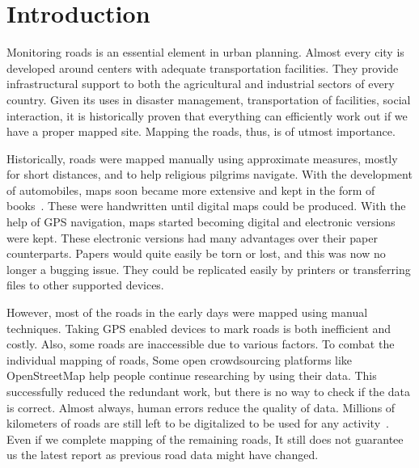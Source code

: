 \chapter{Introduction}\label{chapt:intro}

Monitoring roads is an essential element in urban planning. Almost every city is developed around centers with adequate transportation facilities. They provide infrastructural support to both the agricultural and industrial sectors of every country. Given its uses in disaster management, transportation of facilities, social interaction, it is historically proven that everything can efficiently work out if we have a proper mapped site. Mapping the roads, thus, is of utmost importance.

Historically, roads were mapped manually using approximate measures, mostly for short distances, and to help religious pilgrims navigate. With the development of automobiles, maps soon became more extensive and kept in the form of books~\cite{firstMapBooks}. These were handwritten until digital maps could be produced. With the help of GPS navigation, maps started becoming digital and electronic versions were kept. These electronic versions had many advantages over their paper counterparts. Papers would quite easily be torn or lost, and this was now no longer a bugging issue. They could be replicated easily by printers or transferring files to other supported devices.

However, most of the roads in the early days were mapped using manual techniques. Taking GPS enabled devices to mark roads is both inefficient and costly. Also, some roads are inaccessible due to various factors. To combat the individual mapping of roads, Some open crowdsourcing platforms like OpenStreetMap help people continue researching by using their data. This successfully reduced the redundant work, but there is no way to check if the data is correct. Almost always, human errors reduce the quality of data. Millions of kilometers of roads are still left to be digitalized to be used for any activity~\cite{MapsDoneOSM}. Even if we complete mapping of the remaining roads, It still does not guarantee us the latest report as previous road data might have changed.

